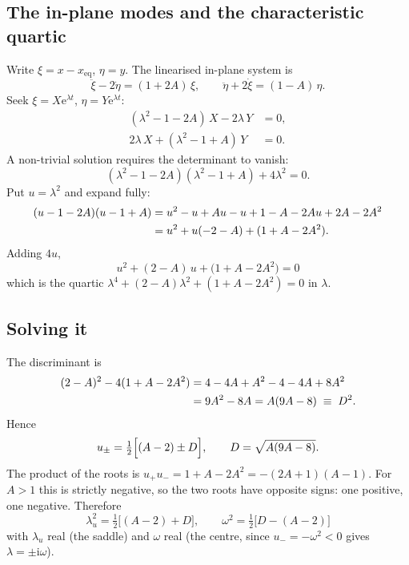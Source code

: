 \documentclass[11pt,a4paper]{article}
\begin{document}
\subsection{The in-plane modes and the characteristic quartic}

Write $\xi=x-x_{\mathrm{eq}}$, $\eta=y$. The linearised in-plane system is
\begin{equation}
  \ddot\xi - 2\dot\eta = (1+2A)\,\xi, \qquad
  \ddot\eta + 2\dot\xi = (1-A)\,\eta .
  \label{eq:inplane}
\end{equation}
Seek $\xi=X\mathrm{e}^{\lambda t}$, $\eta=Y\mathrm{e}^{\lambda t}$:
\begin{align}
  (\lambda^2 - 1 - 2A)\,X - 2\lambda\,Y &= 0, \\
  2\lambda\,X + (\lambda^2 - 1 + A)\,Y &= 0 .
\end{align}
A non-trivial solution requires the determinant to vanish:
\begin{equation}
  (\lambda^2-1-2A)(\lambda^2-1+A) + 4\lambda^2 = 0 .
\end{equation}
Put $u=\lambda^2$ and expand fully:
\begin{align}
  (u-1-2A)(u-1+A)
  &= u^2 - u + Au - u + 1 - A - 2Au + 2A - 2A^2 \notag\\
  &= u^2 + u(-2 - A) + (1 + A - 2A^2) .
\end{align}
Adding $4u$,
\begin{equation}
  \boxed{\;u^2 + (2-A)\,u + \bigl(1+A-2A^2\bigr) = 0\;}
  \label{eq:quartic}
\end{equation}
which is the quartic $\lambda^4+(2-A)\lambda^2+(1+A-2A^2)=0$ in $\lambda$.

\subsection{Solving it}

The discriminant is
\begin{align}
  (2-A)^2 - 4(1+A-2A^2)
  &= 4 - 4A + A^2 - 4 - 4A + 8A^2 \notag\\
  &= 9A^2 - 8A = A(9A-8) \;\equiv\; D^2 .
\end{align}
Hence
\begin{equation}
  u_{\pm} = \tfrac12\Bigl[(A-2) \pm D\Bigr], \qquad
  D = \sqrt{A(9A-8)} .
  \label{eq:roots}
\end{equation}
The product of the roots is $u_+u_- = 1+A-2A^2 = -(2A+1)(A-1)$. For $A>1$ this
is strictly negative, so the two roots have opposite signs: one positive, one
negative. Therefore
\begin{equation}
  \boxed{\;\lambda_u^2 = \tfrac12\bigl[(A-2)+D\bigr], \qquad
          \omega^2 = \tfrac12\bigl[D-(A-2)\bigr]\;}
  \label{eq:rates}
\end{equation}
with $\lambda_u$ real (the saddle) and $\omega$ real (the centre, since
$u_-=-\omega^2<0$ gives $\lambda=\pm\mathrm{i}\omega$).
\end{document}
